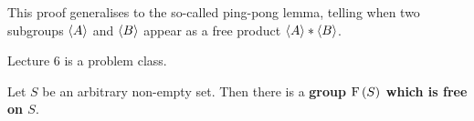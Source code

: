 \begin{remark*}
This proof generalises to the so-called ping-pong lemma, telling when two subgroups $ \left\langle A \right\rangle $ and $ \left\langle B \right\rangle $ appear as a free product $ \left\langle A \right\rangle * \left\langle B \right\rangle $.
\end{remark*}


Lecture 6 is a problem class.

\pagebreak


\begin{proposition}
Let $ S $ be an arbitrary non-empty set. Then there is a \textbf{group $ \F\br{S} $ which is free on $ S $}.
\end{proposition}

